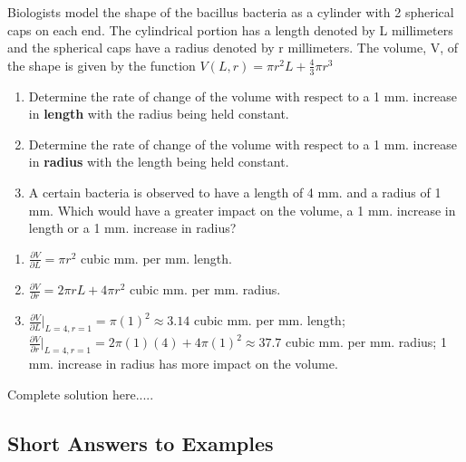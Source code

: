 \newpage
\begin{example}
Biologists model the shape of the bacillus bacteria as a cylinder with 2 spherical caps on each end.  The cylindrical portion has a length denoted by L millimeters and the spherical caps have a radius denoted by r millimeters.   The volume, V, of the shape is given by the function $V(L,r)=\pi r^2 L+\displaystyle\frac{4}{3}\pi r^3$
\renewcommand{\labelenumi}{\textbf{(\alph{enumi})}}
\begin{enumerate}[leftmargin=*]
    \item Determine the rate of change of the volume with respect to a 1 mm. increase in \textbf{length} with the radius being held constant.                                                 
    \item Determine the rate of change of the volume with respect to a 1 mm. increase in \textbf{radius} with the length being held constant.    
    \item A certain bacteria is observed to have a length of 4 mm. and a radius of 1 mm.  Which would have a greater impact on the volume, a 1 mm. increase in length or a 1 mm. increase in radius?   
    \end{enumerate}
    \begin{sol}
    \renewcommand{\labelenumi}{\textbf{(\alph{enumi})}}
    \begin{enumerate}[leftmargin=*]
    \item  $\displaystyle \frac{\partial V}{\partial L}=\pi r^2$ cubic mm. per mm. length.
    \item $\displaystyle \frac{\partial V}{\partial r}=2\pi rL+4\pi r^2$ cubic mm. per mm. radius.
    \item  $\displaystyle \frac{\partial V}{\partial L}\Big|_{L=4,r=1}=\pi (1)^2\approx 3.14$ cubic mm. per mm. length; $\displaystyle \frac{\partial V}{\partial r}\Big|_{L=4,r=1}=2\pi (1)(4)+4\pi (1)^2\approx 37.7$ cubic mm. per mm. radius; 1 mm. increase in radius has more impact on the volume.
    
    \end{enumerate}
    \end{sol}
    \begin{solL}
    Complete solution here.....
    
    \end{solL}
    
\end{example}





\newpage
\subsection*{Short Answers to Examples}





